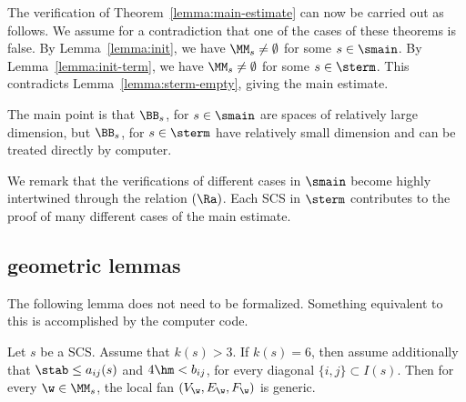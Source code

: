 \begin{remark}
The verification of 
Theorem~\ref{lemma:main-estimate}  can now be
carried out as follows.  We assume for a contradiction that
one of the cases of these theorems is false.  By Lemma~\ref{lemma:init}, we have
$\MM_s\ne\emptyset$ for some $s\in \smain$.  
By Lemma~\ref{lemma:init-term}, we have
$\MM_s\ne\emptyset$ for some $s\in \sterm$. 
This contradicts Lemma~\ref{lemma:sterm-empty}, giving
 the main estimate.
\end{remark}

The main point is that $\BB_s$, for $s\in\smain$ are spaces of relatively large
dimension, but $\BB_s$, for $s\in\sterm$ have relatively small dimension and
can be treated directly by computer.




We remark that the verifications of  different cases in $\smain$ become
highly intertwined through the relation $(\Ra)$.  Each SCS
 in $\sterm$ contributes to the proof of many different cases
of the main estimate.




\subsection{geometric lemmas}


The following lemma does not need to be formalized.  Something
equivalent
to this is accomplished by the computer code.


\begin{lemma}\label{lemma:bjo} 
Let $s$ be a SCS.
Assume that $k(s)>3$.
If $k(s)=6$, then assume additionally that
$\stab\le a_{i j}(s)$ and $4\hm < b_{i j}$, 
for every diagonal $\{i,j\}\subset I(s)$.
Then for every  $\w\in\MM_s$,  the local fan $(V_\w,E_\w,F_\w)$ is generic.
\end{lemma}

